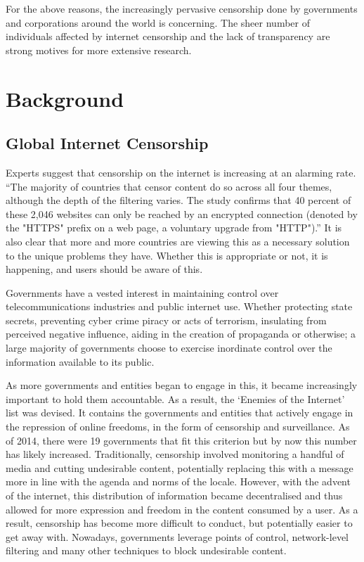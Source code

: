 For the above reasons, the increasingly pervasive censorship done by governments and corporations around the world is concerning. The sheer number of individuals affected by internet censorship and the lack of transparency are strong motives for more extensive research.

\section{Background}
\subsection{Global Internet Censorship}
Experts suggest that censorship on the internet is increasing at an alarming rate. “The majority of countries that censor content do so across all four themes, although the depth of the filtering varies. The study confirms that 40 percent of these 2,046 websites can only be reached by an 
encrypted connection (denoted by the "HTTPS" prefix on a web page, a voluntary upgrade from "HTTP").” \cite{Zittrain2017Censorship} It is also clear that more and more countries are viewing this as a necessary solution to the unique problems they have. Whether this is appropriate or not, it is happening, and users should be aware of this. 

Governments have a vested interest in maintaining control over telecommunications industries and public internet use. Whether protecting state secrets, preventing cyber crime piracy or acts of terrorism, insulating from perceived negative influence, aiding in the creation of propaganda or otherwise; a large majority of governments choose to exercise inordinate control over the 
information available to its public.  

As more governments and entities began to engage in this, it became increasingly important to hold them accountable. As a result, the ‘Enemies of the Internet’ list was devised. It contains the governments and entities that actively engage in the repression of online freedoms, in the form of censorship and surveillance. As of 2014, there were 19 governments that fit this criterion but by now this number has likely increased. \cite{RSFEnemiesInternet2014} Traditionally, censorship involved monitoring a handful of media and cutting undesirable content, potentially replacing this with a message more in line with the agenda and norms of the locale. However, with the advent of the internet, this distribution of information became decentralised and thus allowed for more expression and freedom in the content consumed by a user. As a result, censorship has become more difficult to conduct, but potentially easier to get away with. Nowadays, governments leverage points of control, network-level filtering and many other techniques to block undesirable content.


